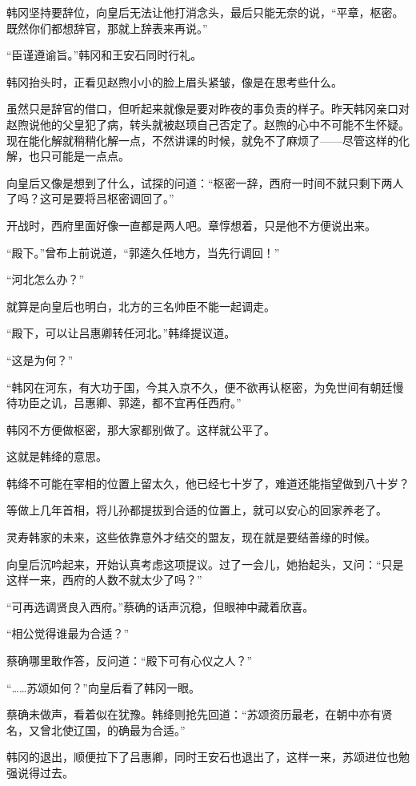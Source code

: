 韩冈坚持要辞位，向皇后无法让他打消念头，最后只能无奈的说，“平章，枢密。既然你们都想辞官，那就上辞表来再说。”

“臣谨遵谕旨。”韩冈和王安石同时行礼。

韩冈抬头时，正看见赵煦小小的脸上眉头紧皱，像是在思考些什么。

虽然只是辞官的借口，但听起来就像是要对昨夜的事负责的样子。昨天韩冈亲口对赵煦说他的父皇犯了病，转头就被赵顼自己否定了。赵煦的心中不可能不生怀疑。现在能化解就稍稍化解一点，不然讲课的时候，就免不了麻烦了——尽管这样的化解，也只可能是一点点。

向皇后又像是想到了什么，试探的问道：“枢密一辞，西府一时间不就只剩下两人了吗？这可是要将吕枢密调回了。”

开战时，西府里面好像一直都是两人吧。章惇想着，只是他不方便说出来。

“殿下。”曾布上前说道，“郭逵久任地方，当先行调回！”

“河北怎么办？”

就算是向皇后也明白，北方的三名帅臣不能一起调走。

“殿下，可以让吕惠卿转任河北。”韩绛提议道。

“这是为何？”

“韩冈在河东，有大功于国，今其入京不久，便不欲再认枢密，为免世间有朝廷慢待功臣之讥，吕惠卿、郭逵，都不宜再任西府。”

韩冈不方便做枢密，那大家都别做了。这样就公平了。

这就是韩绛的意思。

韩绛不可能在宰相的位置上留太久，他已经七十岁了，难道还能指望做到八十岁？

等做上几年首相，将儿孙都提拔到合适的位置上，就可以安心的回家养老了。

灵寿韩家的未来，这些依靠意外才结交的盟友，现在就是要结善缘的时候。

向皇后沉吟起来，开始认真考虑这项提议。过了一会儿，她抬起头，又问：“只是这样一来，西府的人数不就太少了吗？”

“可再选调贤良入西府。”蔡确的话声沉稳，但眼神中藏着欣喜。

“相公觉得谁最为合适？”

蔡确哪里敢作答，反问道：“殿下可有心仪之人？”

“……苏颂如何？”向皇后看了韩冈一眼。

蔡确未做声，看着似在犹豫。韩绛则抢先回道：“苏颂资历最老，在朝中亦有贤名，又曾北使辽国，的确最为合适。”

韩冈的退出，顺便拉下了吕惠卿，同时王安石也退出了，这样一来，苏颂进位也勉强说得过去。

